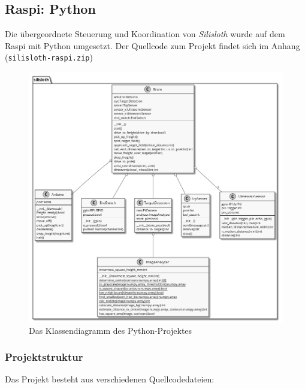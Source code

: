 \subsection{Raspi: Python}
\label{sec:raspi}

Die übergeordnete Steuerung und Koordination von \textit{Silisloth} wurde auf dem Raspi mit Python umgesetzt. Der Quellcode zum Projekt findet sich im Anhang (\texttt{silisloth-raspi.zip})

\begin{figure}
    \centering
    \includegraphics[width=\textwidth]{graphs/klassendiagramm.png}
    \caption{Das Klassendiagramm des Python-Projektes}
    \label{fig:klassendiagramm}
\end{figure}

\subsubsection{Projektstruktur}

Das Projekt besteht aus verschiedenen Quellcodedateien:

